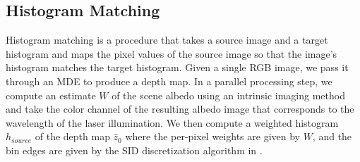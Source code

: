 %


\subsection{Histogram Matching}
%  
Histogram matching is a procedure that takes a source image and a target
histogram and maps the pixel values of the source image so that the image's
histogram matches the target histogram. Given a single RGB image, we pass it
through an MDE to produce a depth map. In a parallel processing step,
we compute an estimate $W$ of the scene albedo using an intrinsic imaging method and
take the color channel of the resulting albedo image that corresponds to the
wavelength of the laser illumination.
We then compute a weighted histogram $h_{source}$ of the depth map $\hat z_0$ where the
per-pixel weights are given by $W$, and the bin edges are given by the SID
discretization algorithm in \cite{Fu2018}.


